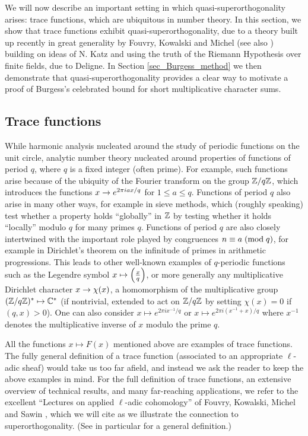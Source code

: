 \documentclass[oneside,11pt]{amsart}
\begin{document}
We will now describe an important setting in which quasi-superorthogonality arises:  trace functions,  which are ubiquitous in number theory.  
In this section, we show that trace functions exhibit  quasi-superorthogonality,  due to a theory built up recently in great generality  by   Fouvry, Kowalski and  Michel  \cite{FKM15} (see also \cite{FKMS19}) building on ideas of N. Katz and using the truth of the Riemann Hypothesis over finite fields, due to Deligne. In Section \ref{sec_Burgess_method} we then demonstrate that quasi-superorthogonality provides a clear way to motivate a proof of Burgess's celebrated bound for short multiplicative character sums.


\subsection{Trace functions }
While harmonic analysis nucleated around the study of periodic functions on the unit circle, analytic number theory nucleated around properties of functions of period $q$, where $q$ is a fixed integer (often prime).  
For example, such functions arise because of the ubiquity of the Fourier transform on the group $\mathbb{Z}/q\mathbb{Z}$, which introduces the functions $x \rightarrow  e^{2\pi i a x/q}$ for   $1 \leq a \leq q$. Functions of period $q$ also arise in many other ways, for example in sieve methods, which  (roughly speaking) test whether a property holds ``globally'' in $\mathbb{Z}$ by testing whether it holds ``locally'' modulo $q$ for many primes $q$. 
Functions  of period $q$ are also closely intertwined with the important role played by congruences $n \equiv a \; ( \text{mod} \; q)$, for example in Dirichlet's theorem on the infinitude of primes in arithmetic progressions. This leads  to other well-known examples of $q$-periodic  functions such as the   Legendre symbol $x \mapsto \left( \frac{x}{q}\right)$, or more generally any multiplicative Dirichlet character $x \rightarrow \chi(x)$, a homomorphism  of the multiplicative group $(\mathbb{Z}/q\mathbb{Z})^* \mapsto \mathbb{C}^*$ (if nontrivial, extended to act on $\mathbb{Z}/q\mathbb{Z}$ by setting $\chi(x)=0$ if $(q,x)>0$). One can also consider $x \mapsto e^{2\pi i x^{-1}/q}$ or $x \mapsto e^{2\pi i (x^{-1} + x)/q}$ where $x^{-1}$ denotes the multiplicative inverse of $x$ modulo the prime $q$. 

All the functions $x \mapsto F(x)$ mentioned above are examples of trace functions.
The fully general definition of a trace function (associated to an appropriate $\ell$-adic sheaf) would take us too far afield,
and instead we ask the reader to keep   the above examples in mind.
For the full definition of trace functions, an extensive overview of technical results, and many far-reaching applications, we refer to the excellent ``Lectures on applied $\ell$-adic cohomology'' of Fouvry, Kowalski, Michel and Sawin \cite{FKMS19}, which we will cite as we illustrate the connection to superorthogonality. (See in particular   \cite[Dfn. 3.5]{FKMS19} for a general definition.)
\end{document}
